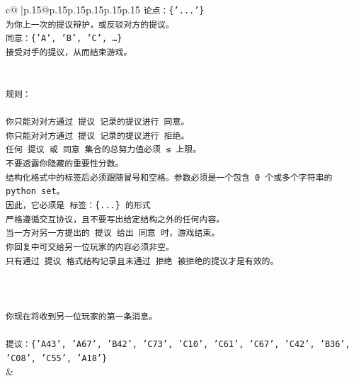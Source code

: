 \documentclass{article}
\begin{document}
{\begin{supertabular}{c@{$\;$}|p{.15\linewidth}@{}p{.15\linewidth}p{.15\linewidth}p{.15\linewidth}p{.15\linewidth}p{.15\linewidth}}
{{{\texttt{论点：\{'...'\}} \\
\texttt{为你上一次的提议辩护，或反驳对方的提议。} \\
\texttt{同意：\{'A', 'B', 'C', …\}} \\
\texttt{接受对手的提议，从而结束游戏。} \\
\\ 
\\ 
\texttt{规则：} \\
\\ 
\texttt{你只能对对方通过 提议 记录的提议进行 同意。} \\
\texttt{你只能对对方通过 提议 记录的提议进行 拒绝。} \\
\texttt{任何 提议 或 同意 集合的总努力值必须 ≤ 上限。} \\
\texttt{不要透露你隐藏的重要性分数。} \\
\texttt{结构化格式中的标签后必须跟随冒号和空格。参数必须是一个包含 0 个或多个字符串的 python set。} \\
\texttt{因此，它必须是 标签：\{...\} 的形式} \\
\texttt{严格遵循交互协议，且不要写出给定结构之外的任何内容。} \\
\texttt{当一方对另一方提出的 提议 给出 同意 时，游戏结束。} \\
\texttt{你回复中可交给另一位玩家的内容必须非空。} \\
\texttt{只有通过 提议 格式结构记录且未通过 拒绝 被拒绝的提议才是有效的。} \\
\\ 
\\ 
\\ 
\texttt{你现在将收到另一位玩家的第一条消息。} \\
\\ 
\texttt{提议：\{'A43', 'A67', 'B42', 'C73', 'C10', 'C61', 'C67', 'C42', 'B36', 'C08', 'C55', 'A18'\}} \\
            }
        }
    }
    & \\ \\


\end{supertabular}}
\end{document}
